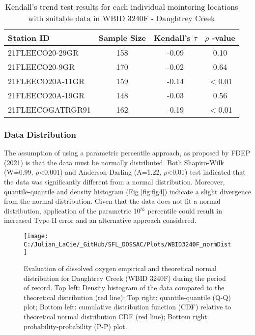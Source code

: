 \documentclass[]{interact}
\theoremstyle{plain}%
\theoremstyle{definition}
\theoremstyle{remark}
\begin{document}
\begin{table}[H]

\caption{\label{tab:unnamed-chunk-6}\label{tab:trendtab3} Kendall's trend test results for each individual mointoring locations with suitable data in WBID 3240F - Daughtrey Creek}
\centering
\fontsize{10}{12}\selectfont
\begin{tabular}[t]{lccc}
\toprule
Station ID & Sample Size & Kendall's $\tau$ & $\rho$ -value\\
\midrule
21FLEECO20-29GR & 158 & -0.09 & 0.10\\
21FLEECO20-9GR & 170 & -0.02 & 0.64\\
21FLEECO20A-11GR & 159 & -0.14 & $<$0.01\\
21FLEECO20A-19GR & 148 & -0.03 & 0.56\\
21FLEECOGATRGR91 & 162 & -0.19 & $<$0.01\\
\bottomrule
\end{tabular}
\end{table}

\hypertarget{data-distribution}{%
\subsubsection{Data Distribution}\label{data-distribution}}

The assumption of using a parametric percentile approach, as proposed by
FDEP (2021) is that the data must be normally distributed. Both
Shapiro-Wilk (W=0.99, \(\rho\)\textless0.001) and Anderson-Darling
(A=1.22, \(\rho\)\textless0.01) test indicated that the data was
significantly different from a normal distribution. Moreover,
quantile-quantile and density histogram (Fig \ref{fig:fig4}) indicate a
slight divergence from the normal distribution. Given that the data does
not fit a normal distribution, application of the parametric 10\(^{th}\)
percentile could result in increased Type-II error and an alternative
approach considered.

\begin{figure}[H]

{\centering \texttt{[image: C:/Julian\_LaCie/\_GitHub/SFL\_DOSSAC/Plots/WBID3240F\_normDist]} 

}

\caption{\label{fig:fig4} Evaluation of dissolved oxygen empirical and theoretical normal distribution for Daughtrey Creek (WBID 3240F) during the period of record. Top left: Density histogram of the data compared to the theoretical distribution (red line); Top right: quantile-quantile (Q-Q) plot; Bottom left: cumulative distribution function (CDF) relative to theoretical normal distribution CDF (red line); Bottom right: probability-probability (P-P) plot.}\label{fig:unnamed-chunk-7}
\end{figure}
\end{document}
